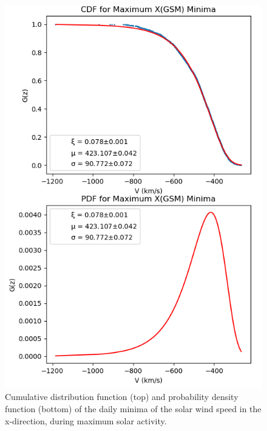 \documentclass[11pt]{article}
\begin{document}
\begin{figure}[t!]
\begin{minipage}{0.48\textwidth}
                \includegraphics[width=\textwidth]{fig_method/SWEmaxXmin.png}
                \caption{Cumulative distribution function (top) and probability density function (bottom) of the daily minima of the solar wind speed in the x-direction, during maximum solar activity.}
                \label{fig:SWEmaxXmin}
            \end{minipage}
        \end{figure}
\end{document}
